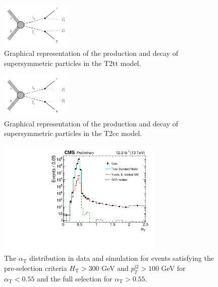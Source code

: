 \begin{figure}[h!] \begin{center}
    \includegraphics[width=0.3\textwidth]{Supplementary/T2tt_feyn_aux}
        \caption{
            Graphical representation of the production and decay of
            supersymmetric particles in the T2tt model.
        }
        \label{fig:simplified-models-feyn-T2tt}
\end{center} \end{figure}

\begin{figure}[h!] \begin{center}
    \includegraphics[width=0.3\textwidth]{Supplementary/T2cc_feyn_aux}
        \caption{
            Graphical representation of the production and decay of
            supersymmetric particles in the T2cc model.
        }
        \label{fig:simplified-models-feyn-T2cc}
\end{center} \end{figure}

\clearpage
\begin{figure}[p]
    \caption{ 
    The $\alpha_{\mathrm{T}}$ distribution in data and simulation for events satisfying the
	pre-selection criteria $H_{\mathrm{T}} > 300$ GeV and
	$p_{T}^{\mathrm{j2}} > 100$ GeV for $\alpha_{\mathrm{T}} < 0.55$ and
	the full selection for $\alpha_{\mathrm{T}} > 0.55$.
    \label{fig:alphaT} }
  \begin{center}
  \includegraphics[width=0.7\textwidth]{Supplementary/alphaT_aux}
  \end{center}
\end{figure}


